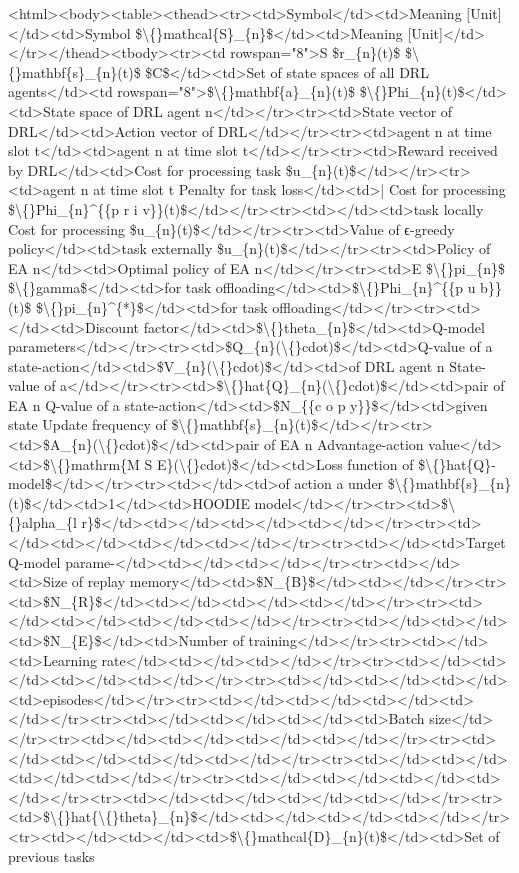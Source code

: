 \documentclass{article}
\begin{document}
<html><body><table><thead><tr><td>Symbol</td><td>Meaning [Unit]</td><td>Symbol \$\textbackslash\{\}mathcal\{S\}\_\{n\}\$</td><td>Meaning [Unit]</td></tr></thead><tbody><tr><td rowspan="8">S \$r\_\{n\}(t)\$ \$\textbackslash\{\}mathbf\{s\}\_\{n\}(t)\$ \$C\$</td><td>Set of state spaces of all DRL agents</td><td rowspan="8">\$\textbackslash\{\}mathbf\{a\}\_\{n\}(t)\$ \$\textbackslash\{\}Phi\_\{n\}(t)\$</td><td>State space of DRL agent n</td></tr><tr><td>State vector of DRL</td><td>Action vector of DRL</td></tr><tr><td>agent n at time slot t</td><td>agent n at time slot t</td></tr><tr><td>Reward received by DRL</td><td>Cost for processing task \$u\_\{n\}(t)\$</td></tr><tr><td>agent n at time slot t Penalty for task loss</td><td>| Cost for processing \$\textbackslash\{\}Phi\_\{n\}\textasciicircum{}\{\{p r i v\}\}(t)\$</td></tr><tr><td></td><td>task locally Cost for processing \$u\_\{n\}(t)\$</td></tr><tr><td>Value of ϵ-greedy policy</td><td>task externally \$u\_\{n\}(t)\$</td></tr><tr><td>Policy of EA n</td><td>Optimal policy of EA n</td></tr><tr><td>E \$\textbackslash\{\}pi\_\{n\}\$ \$\textbackslash\{\}gamma\$</td><td>for task offloading</td><td>\$\textbackslash\{\}Phi\_\{n\}\textasciicircum{}\{\{p u b\}\}(t)\$ \$\textbackslash\{\}pi\_\{n\}\textasciicircum{}\{*\}\$</td><td>for task offloading</td></tr><tr><td></td><td>Discount factor</td><td>\$\textbackslash\{\}theta\_\{n\}\$</td><td>Q-model parameters</td></tr><tr><td>\$Q\_\{n\}(\textbackslash\{\}cdot)\$</td><td>Q-value of a state-action</td><td>\$V\_\{n\}(\textbackslash\{\}cdot)\$</td><td>of DRL agent n State-value of a</td></tr><tr><td>\$\textbackslash\{\}hat\{Q\}\_\{n\}(\textbackslash\{\}cdot)\$</td><td>pair of EA n Q-value of a state-action</td><td>\$N\_\{\{c o p y\}\}\$</td><td>given state Update frequency of \$\textbackslash\{\}mathbf\{s\}\_\{n\}(t)\$</td></tr><tr><td>\$A\_\{n\}(\textbackslash\{\}cdot)\$</td><td>pair of EA n Advantage-action value</td><td>\$\textbackslash\{\}mathrm\{M S E\}(\textbackslash\{\}cdot)\$</td><td>Loss function of \$\textbackslash\{\}hat\{Q\}-model\$</td></tr><tr><td></td><td>of action a under \$\textbackslash\{\}mathbf\{s\}\_\{n\}(t)\$</td><td>1</td><td>HOODIE model</td></tr><tr><td>\$\textbackslash\{\}alpha\_\{l r\}\$</td><td></td><td></td><td></td></tr><tr><td></td><td></td><td></td><td></td></tr><tr><td></td><td>Target Q-model parame-</td><td></td><td></td></tr><tr><td></td><td>Size of replay memory</td><td>\$N\_\{B\}\$</td><td></td></tr><tr><td>\$N\_\{R\}\$</td><td></td><td></td><td></td></tr><tr><td></td><td></td><td></td><td></td></tr><tr><td></td><td></td><td>\$N\_\{E\}\$</td><td>Number of training</td></tr><tr><td></td><td>Learning rate</td><td></td><td></td></tr><tr><td></td><td></td><td></td><td></td></tr><tr><td></td><td></td><td></td><td>episodes</td></tr><tr><td></td><td></td><td></td><td></td></tr><tr><td></td><td></td><td></td><td>Batch size</td></tr><tr><td></td><td></td><td></td><td></td></tr><tr><td></td><td></td><td></td><td></td></tr><tr><td></td><td></td><td></td><td></td></tr><tr><td></td><td></td><td></td><td></td></tr><tr><td></td><td></td><td></td><td></td></tr><tr><td>\$\textbackslash\{\}hat\{\textbackslash\{\}theta\}\_\{n\}\$</td><td></td><td></td><td></td></tr><tr><td></td><td></td><td>\$\textbackslash\{\}mathcal\{D\}\_\{n\}(t)\$</td><td>Set of previous tasks 
\end{document}
